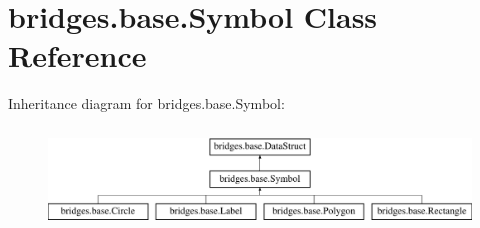 \hypertarget{classbridges_1_1base_1_1_symbol}{}\section{bridges.\+base.\+Symbol Class Reference}
\label{classbridges_1_1base_1_1_symbol}
Inheritance diagram for bridges.\+base.\+Symbol\+:\begin{figure}[H]
\begin{center}
\leavevmode
\includegraphics[height=2.692308cm]{classbridges_1_1base_1_1_symbol}
\end{center}
\end{figure}
